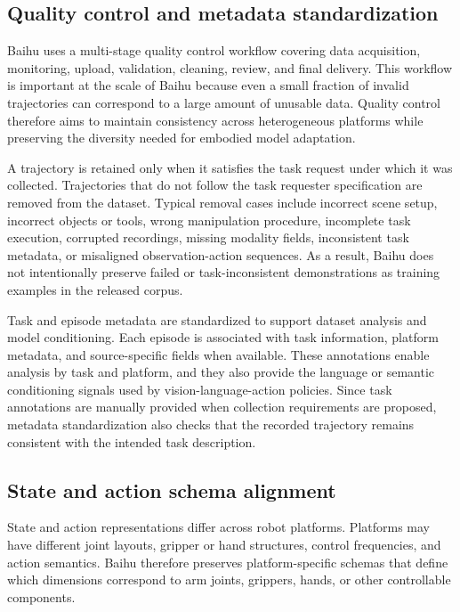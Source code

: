 \subsection{Quality control and metadata standardization}

Baihu uses a multi-stage quality control workflow covering data acquisition, monitoring, upload, validation, cleaning, review, and final delivery. This workflow is important at the scale of Baihu because even a small fraction of invalid trajectories can correspond to a large amount of unusable data. Quality control therefore aims to maintain consistency across heterogeneous platforms while preserving the diversity needed for embodied model adaptation.

A trajectory is retained only when it satisfies the task request under which it was collected. Trajectories that do not follow the task requester specification are removed from the dataset. Typical removal cases include incorrect scene setup, incorrect objects or tools, wrong manipulation procedure, incomplete task execution, corrupted recordings, missing modality fields, inconsistent task metadata, or misaligned observation-action sequences. As a result, Baihu does not intentionally preserve failed or task-inconsistent demonstrations as training examples in the released corpus.

Task and episode metadata are standardized to support dataset analysis and model conditioning. Each episode is associated with task information, platform metadata, and source-specific fields when available. These annotations enable analysis by task and platform, and they also provide the language or semantic conditioning signals used by vision-language-action policies. Since task annotations are manually provided when collection requirements are proposed, metadata standardization also checks that the recorded trajectory remains consistent with the intended task description.

\subsection{State and action schema alignment}

State and action representations differ across robot platforms. Platforms may have different joint layouts, gripper or hand structures, control frequencies, and action semantics. Baihu therefore preserves platform-specific schemas that define which dimensions correspond to arm joints, grippers, hands, or other controllable components.

